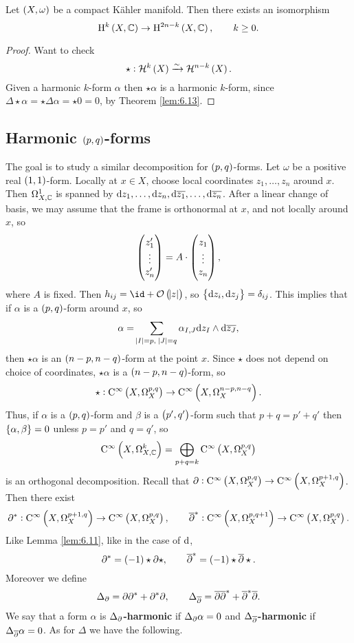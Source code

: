 \begin{theorem}
Let $ \br{X, \omega} $ be a compact K\"ahler manifold. Then there exists an isomorphism
$$ \H^k\br{X, \CC} \to \H^{2n - k}\br{X, \CC}, \qquad k \ge 0. $$
\end{theorem}

\begin{proof}
Want to check
$$ \star : \HHH^k\br{X} \xrightarrow{\sim} \HHH^{n - k}\br{X}. $$
Given a harmonic $ k $-form $ \alpha $ then $ \star\alpha $ is a harmonic $ k $-form, since $ \Delta\star\alpha = \star\Delta\alpha = \star 0 = 0 $, by Theorem \ref{lem:6.13}.
\end{proof}

\subsection{Harmonic \texorpdfstring{$ \br{p, q} $}{(p, q)}-forms}


The goal is to study a similar decomposition for $ \br{p, q} $-forms. Let $ \omega $ be a positive real $ \br{1, 1} $-form. Locally at $ x \in X $, choose local coordinates $ z_1, \dots, z_n $ around $ x $. Then $ \Omega_{X, \mathbb{C}}^1 $ is spanned by $ \mathrm{d} z_1, \dots, \mathrm{d} z_n, \mathrm{d}\overline{z_1}, \dots, \mathrm{d}\overline{z_n} $. After a linear change of basis, we may assume that the frame is orthonormal at $ x $, and not locally around $ x $, so
$$ \begin{pmatrix} z_1' \\ \vdots \\ z_n' \end{pmatrix} = A \cdot \begin{pmatrix} z_1 \\ \vdots \\ z_n \end{pmatrix}, $$
where $ A $ is fixed. Then $ h_{ij} = \id + \OOO\br{\abs{z}} $, so $ \cbr{\d z_i, \d z_j} = \delta_{ij} $. This implies that if $ \alpha $ is a $ \br{p, q} $-form around $ x $, so
$$ \alpha = \sum_{\abs{I} = p, \ \abs{J} = q} \alpha_{I, J}\mathrm{d} z_I \wedge \mathrm{d}\overline{z_J}, $$
then $ \star\alpha $ is an $ \br{n - p, n - q} $-form at the point $ x $. Since $ \star $ does not depend on choice of coordinates, $ \star\alpha $ is a $ \br{n - p, n - q} $-form, so
$$ \star : \CO{X}{p, q} \to \CO{X}{n - p, n - q}. $$
Thus, if $ \alpha $ is a $ \br{p, q} $-form and $ \beta $ is a $ \br{p', q'} $-form such that $ p + q = p' + q' $ then $ \cbr{\alpha, \beta} = 0 $ unless $ p = p' $ and $ q = q' $, so
$$ \COC{X}{k} = \bigoplus_{p + q = k} \CO{X}{p, q} $$
is an orthogonal decomposition. Recall that $ \da : \CO{X}{p, q} \to \CO{X}{p + 1, q} $. Then there exist
$$ \da^* : \CO{X}{p + 1, q} \to \CO{X}{p, q}, \qquad \dab^* : \CO{X}{p, q + 1} \to \CO{X}{p, q}. $$
Like Lemma \ref{lem:6.11}, like in the case of $ \mathrm{d} $,
$$ \da^* = \br{-1}\star\da\star, \qquad \dab^* = \br{-1}\star\dab\star. $$
Moreover we define
$$ \Delta_\partial = \partial\partial^* + \partial^*\partial, \qquad \Delta_{\overline{\partial}} = \overline{\partial}\overline{\partial}^* + \overline{\partial}^*\overline{\partial}. $$
We say that a form $ \alpha $ is \textbf{$ \Delta_\partial $-harmonic} if $ \Delta_\partial\alpha = 0 $ and \textbf{$ \Delta_{\overline{\partial}} $-harmonic} if $ \Delta_{\overline{\partial}}\alpha = 0 $. As for $ \Delta $ we have the following.

